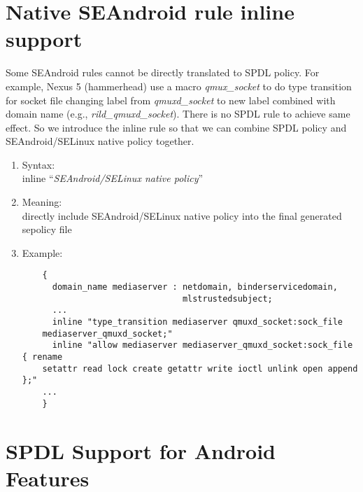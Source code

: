 \documentclass{article}
\begin{document}
\section{Native SEAndroid rule inline support}
Some SEAndroid rules cannot be directly translated to SPDL policy. For example, 
Nexus 5 (hammerhead) use a macro {\em qmux\_socket} to do type transition for 
socket file changing label from {\em qmuxd\_socket} to new label combined with 
domain name (e.g., {\em rild\_qmuxd\_socket}). There is no SPDL rule to achieve 
same effect. So we introduce the inline rule so that we can combine SPDL policy 
and SEAndroid/SELinux native policy together.
\begin{enumerate}
	\item Syntax:\\
	inline ``{\em SEAndroid/SELinux native policy}''\\
	\item Meaning:\\
	directly include SEAndroid/SELinux native policy into the final generated 
	sepolicy file
	\item Example:\\
	\begin{verbatim}
	{
	  domain_name mediaserver : netdomain, binderservicedomain, 
	                            mlstrustedsubject;
	  ...
	  inline "type_transition mediaserver qmuxd_socket:sock_file 
	mediaserver_qmuxd_socket;"
	  inline "allow mediaserver mediaserver_qmuxd_socket:sock_file { rename 
	setattr read lock create getattr write ioctl unlink open append };"
	...
	}
	\end{verbatim}
\end{enumerate}

\section{SPDL Support for Android Features}
\label{sec:android_change}
\end{document}
